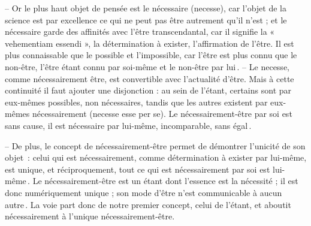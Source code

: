  – Or le plus haut objet de pensée est le nécessaire (necesse), car l’objet de la science est par excellence ce qui ne peut pas être autrement qu’il n’est ; et le nécessaire garde des affinités avec l’être transcendantal, car il signifie la « vehementiam essendi », la détermination à exister, l’affirmation de l’être. Il est plus connaissable que le possible et l’impossible, car l’être est plus connu que le non-être, l’être étant connu par soi-même et le non-être par lui . – Le necesse, comme nécessairement être, est convertible avec l’actualité d’être. Mais à cette continuité il faut ajouter une disjonction : au sein de l’étant, certains sont par eux-mêmes possibles, non nécessaires, tandis que les autres existent par eux-mêmes nécessairement (necesse esse per se). Le nécessairement-être par soi est sans cause, il est nécessaire par lui-même, incomparable, sans égal . 
 
 – De plus, le concept de nécessairement-être permet de démontrer l’unicité de son objet  : celui qui est nécessairement, comme détermination à exister par lui-même, est unique, et réciproquement, tout ce qui est nécessairement par soi est lui-même . Le nécessairement-être est un étant dont l’essence est la nécessité ; il est donc numériquement unique ; son mode d’être n’est communicable à aucun autre . La voie part donc de notre premier concept, celui de l’étant, et aboutit nécessairement à l’unique nécessairement-être.



